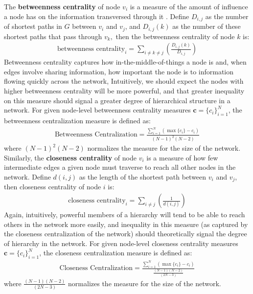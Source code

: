 \documentclass[3p,times]{elsarticle}
\begin{document}
The \textbf{betweenness centrality} of node $v_{i}$ is a measure of the amount of influence a node has on the information transversed through it \cite{freeman1977set}. Define $D_{i,j}$ as the number of shortest paths in $G$ between $v_{i}$ and $v_{j}$, and $D_{i,j}(k)$ as the number of these shortest paths that pass through $v_{k},$ then the betweenness centrality of node $k$ is:
\begin{align}
	\text{betweenness centrality}_i = \sum_{i\neq k\neq j}{(\frac{D_{i,j}(k)}{D_{i,j}})}
\end{align}
Betweenness centrality captures how in-the-middle-of-things a node is and, when edges involve sharing information, how important the node is to information flowing quickly across the network, Intuitively, we should expect the nodes with higher betweenness centrality will be more powerful, and that greater inequality on this measure should signal a greater degree of hierarchical structure in a network. For given node-level betweenness centrality measures $\mathbf{c} = \{c_i\}_{i=1}^N$, the betweenness centralization measure is defined as: 
\begin{align}
	\text{Betweenness Centralization} = \frac{\sum_{i=1}^{N}{(\max\{c_{i}\}-c_{i})}}{(N-1)^2(N-2)}
\end{align}
where $(N-1)^2(N-2)$ normalizes the measure for the size of the network. Similarly, the \textbf{closeness centrality} of node $v_{i}$ is a measure of how few intermediate edges a given node must traverse to reach all other nodes in the network. Define $d(i,j)$ as the length of the shortest path between $v_{i}$ and $v_{j}$, then closeness centrality of node $i$ is: 
\begin{align}
	\text{closeness centrality}_i = \sum_{i\neq j}{(\frac{1}{d(i,j)})}
\end{align}
Again, intuitively, powerful members of a hierarchy will tend to be able to reach others in the network more easily, and inequality in this measure (as captured by the closeness centralization of the network) should theoretically signal the degree of hierarchy in the network. For given node-level closeness centrality measures $\mathbf{c} = \{c_i\}_{i=1}^N$, the closeness centralization measure is defined as: 
\begin{align}
	\text{Closeness Centralization} = \frac{\sum_{i=1}^{N}{(\max\{c_{i}\}-c_{i})}}{\frac{(N-1)(N-2)}{(2N-3)}}
\end{align}
where $\frac{(N-1)(N-2)}{(2N-3)}$ normalizes the measure for the size of the network.
\end{document}
